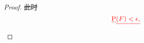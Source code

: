 \documentclass[UTF8]{ctexart}
\theoremstyle{definition}
\theoremstyle{plain}
\providecommand{\DIFadd}[1]{{\protect\color{blue}\uwave{#1}}} %
\providecommand{\DIFdel}[1]{{\protect\color{red}\sout{#1}}}                      %
\providecommand{\DIFaddbegin}{} %
\providecommand{\DIFaddend}{} %
\providecommand{\DIFdelbegin}{} %
\providecommand{\DIFdelend}{} %
\newcommand{\DIFscaledelfig}{0.5}
\newlength{\DIFdelgraphicswidth} %
\newlength{\DIFdelgraphicsheight} %
\newcommand{\DIFaddincludegraphics}[2][]{{\color{blue}\fbox{\DIFOincludegraphics[#1]{#2}}}} %
\newcommand{\DIFdelincludegraphics}[2][]{%
\sbox{\DIFdelgraphicsbox}{\DIFOincludegraphics[#1]{#2}}%
\settoboxwidth{\DIFdelgraphicswidth}{\DIFdelgraphicsbox} %
\settoboxtotalheight{\DIFdelgraphicsheight}{\DIFdelgraphicsbox} %
\scalebox{\DIFscaledelfig}{%
\parbox[b]{\DIFdelgraphicswidth}{\usebox{\DIFdelgraphicsbox}\\[-\baselineskip] \rule{\DIFdelgraphicswidth}{0em}}\llap{\resizebox{\DIFdelgraphicswidth}{\DIFdelgraphicsheight}{%
\setlength{\unitlength}{\DIFdelgraphicswidth}%
\begin{picture}(1,1)%
\thicklines\linethickness{2pt} %
{\color[rgb]{1,0,0}\put(0,0){\framebox(1,1){}}}%
{\color[rgb]{1,0,0}\put(0,0){\line( 1,1){1}}}%
{\color[rgb]{1,0,0}\put(0,1){\line(1,-1){1}}}%
\end{picture}%
}\hspace*{3pt}}} %
} %
\DeclareRobustCommand{\DIFaddbegin}{\DIFOaddbegin \let\includegraphics\DIFaddincludegraphics} %
\DeclareRobustCommand{\DIFaddend}{\DIFOaddend \let\includegraphics\DIFOincludegraphics} %
\DeclareRobustCommand{\DIFdelbegin}{\DIFOdelbegin \let\includegraphics\DIFdelincludegraphics} %
\DeclareRobustCommand{\DIFdelend}{\DIFOaddend \let\includegraphics\DIFOincludegraphics} %
\begin{document}
\begin{proof}
    \DIFaddend
\DIFdel{此时
    }\[{\DIFdel{\rm P}}\DIFdel{(F) < \epsilon,}\]%
\DIFdelend 
\end{proof}








\end{document}
